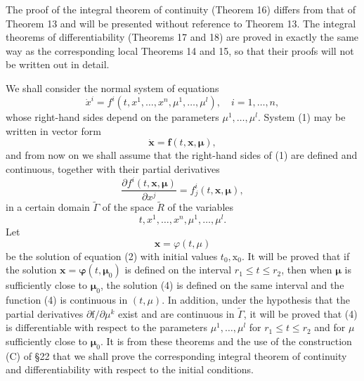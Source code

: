\documentclass[10pt,a5paper]{book}
\theoremstyle{plain}
\theoremstyle{definition}
\theoremstyle{remark}
\begin{document}
The proof of the integral theorem of continuity (Theorem 16) differs from that of Theorem 13 and will be presented without reference to Theorem 13. The integral theorems of differentiability (Theorems 17 and 18) are proved in exactly the same way as the corresponding local Theorems 14 and 15, so that their proofs will not be written out in detail.

We shall consider the normal system of equations
\begin{equation*}
\dot{x}^{i}=f^{i}\left(t, x^{1}, \ldots, x^{n}, \mu^{1}, \ldots, \mu^{l}\right), \quad i=1, \ldots, n, \tag{1}
\end{equation*}
whose right-hand sides depend on the parameters $\mu^{1}, \ldots, \mu^{l}$. System (1) may be written in vector form
\begin{equation*}
\dot{\mathbf{x}}=\mathbf{f}(t, \mathbf{x}, \boldsymbol{\mu}), \tag{2}
\end{equation*}
and from now on we shall assume that the right-hand sides of (1) are defined and continuous, together with their partial derivatives
\begin{equation*}
\frac{\partial f^{i}(t, \mathbf{x}, \boldsymbol{\mu})}{\partial x^{j}}=f_{j}^{i}(t, \mathbf{x}, \boldsymbol{\mu}), \tag{3}
\end{equation*}
in a certain domain $\widetilde{\Gamma}$ of the space $\widetilde{R}$ of the variables
\[
t, x^{1}, \ldots, x^{n}, \mu^{1}, \ldots, \mu^{l} .
\]
Let
\begin{equation*}
\mathbf{x}=\varphi(t, \mu) \tag{4}
\end{equation*}
be the solution of equation (2) with initial values $t_{0}, \mathrm{x}_{0}$. It will be proved that if the solution $\mathbf{x}=\boldsymbol{\varphi}\left(t, \boldsymbol{\mu}_{0}\right)$ is defined on the interval $r_{1} \leq t \leq r_{2}$, then when $\boldsymbol{\mu}$ is sufficiently close to $\boldsymbol{\mu}_{0}$, the solution (4) is defined on the same interval and the function (4) is continuous in $(t, \mu)$. In addition, under the hypothesis that the partial derivatives $\partial \mathrm{f} / \partial \mu^{k}$ exist and are continuous in $\widetilde{\Gamma}$, it will be proved that (4) is differentiable with respect to the parameters $\mu^{1}, \ldots, \mu^{l}$ for $r_{1} \leq t \leq r_{2}$ and for $\mu$ sufficiently close to $\boldsymbol{\mu}_{0}$. It is from these theorems and the use of the construction (C) of §22 that we shall prove the corresponding integral theorem of continuity and differentiability with respect to the initial conditions.
\end{document}

